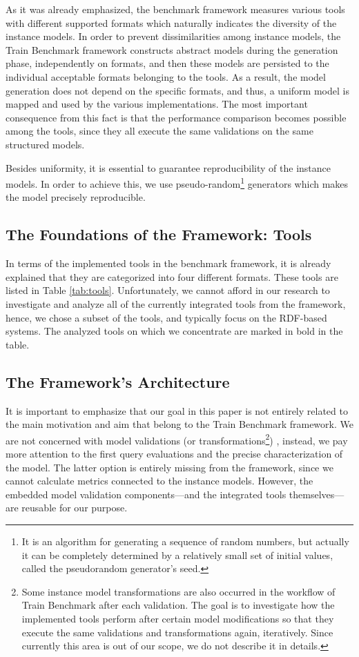 As it was already emphasized, the benchmark framework measures various tools with different supported formats which naturally indicates the diversity of the instance models. In order to prevent dissimilarities among instance models, the Train Benchmark framework constructs abstract models during the generation phase, independently on formats, and then these models are persisted to the individual acceptable formats belonging to the tools. As a result, the model generation does not depend on the specific formats, and thus, a uniform model is mapped and used by the various implementations. The most important consequence from this fact is that the performance comparison becomes possible among the tools, since they all execute the same validations on the same structured models.

Besides uniformity, it is essential to guarantee reproducibility of the instance models. In order to achieve this, we use pseudo-random\footnote{It is an algorithm for generating a sequence of random numbers, but actually it can be completely
	determined by a relatively small set of initial values, called the pseudorandom generator's seed.} generators which makes the model precisely reproducible.

\subsection{The Foundations of the Framework: Tools}

In terms of the implemented tools in the benchmark framework, it is already explained that they are categorized into four different formats. These tools are listed in Table \ref{tab:tools}. Unfortunately, we cannot afford in our research to investigate and analyze all of the currently integrated tools from the framework, hence, we chose a subset of the tools, and typically focus on the RDF-based systems. The analyzed tools on which we concentrate are marked in bold in the table.

\subsection{The Framework's Architecture}

It is important to emphasize that our goal in this paper is not entirely related to the main motivation and aim that belong to the Train Benchmark framework. We are not concerned with model validations (or transformations\footnote{Some instance model transformations are also occurred in the workflow of Train Benchmark after each validation. The goal is to investigate how the implemented tools perform after certain model modifications so that they execute the same validations and transformations again, iteratively. Since currently this area is out of our scope, we do not describe it in details.}) %
, instead, we pay more attention to the first query evaluations and the precise characterization of the model. The latter option is entirely missing from the framework, since we cannot calculate metrics connected to the instance models. However, the embedded model validation components---and the integrated tools themselves---are reusable for our purpose.

